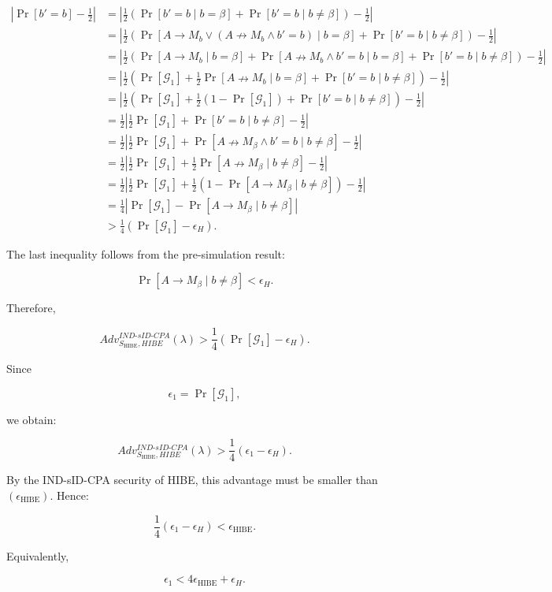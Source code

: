 \documentclass[
]{article}
\begin{document}
\[
\begin{aligned}
\left|\Pr[b'=b]-\frac{1}{2}\right|
&=
\left|
\frac{1}{2}
\left(
\Pr[b'=b\mid b=\beta]
+
\Pr[b'=b\mid b\neq\beta]
\right)
-
\frac{1}{2}
\right| \\[2mm]
&=
\left|
\frac{1}{2}
\left(
\Pr[A\to M_b \vee (A\nrightarrow M_b \wedge b'=b)\mid b=\beta]
+
\Pr[b'=b\mid b\neq\beta]
\right)
-
\frac{1}{2}
\right| \\[2mm]
&=
\left|
\frac{1}{2}
\left(
\Pr[A\to M_b\mid b=\beta]
+
\Pr[A\nrightarrow M_b \wedge b'=b\mid b=\beta]
+
\Pr[b'=b\mid b\neq\beta]
\right)
-
\frac{1}{2}
\right| \\[2mm]
&=
\left|
\frac{1}{2}
\left(
\Pr[\mathcal{G}_1]
+
\frac{1}{2}\Pr[A\nrightarrow M_b\mid b=\beta]
+
\Pr[b'=b\mid b\neq\beta]
\right)
-
\frac{1}{2}
\right| \\[2mm]
&=
\left|
\frac{1}{2}
\left(
\Pr[\mathcal{G}_1]
+
\frac{1}{2}(1-\Pr[\mathcal{G}_1])
+
\Pr[b'=b\mid b\neq\beta]
\right)
-
\frac{1}{2}
\right| \\[2mm]
&=
\frac{1}{2}
\left|
\frac{1}{2}\Pr[\mathcal{G}_1]
+
\Pr[b'=b\mid b\neq\beta]
-
\frac{1}{2}
\right| \\[2mm]
&=
\frac{1}{2}
\left|
\frac{1}{2}\Pr[\mathcal{G}_1]
+
\Pr[A\nrightarrow M_\beta \wedge b'=b\mid b\neq\beta]
-
\frac{1}{2}
\right| \\[2mm]
&=
\frac{1}{2}
\left|
\frac{1}{2}\Pr[\mathcal{G}_1]
+
\frac{1}{2}\Pr[A\nrightarrow M_\beta\mid b\neq\beta]
-
\frac{1}{2}
\right| \\[2mm]
&=
\frac{1}{2}
\left|
\frac{1}{2}\Pr[\mathcal{G}_1]
+
\frac{1}{2}
\left(
1-\Pr[A\to M_\beta\mid b\neq\beta]
\right)
-
\frac{1}{2}
\right| \\[2mm]
&=
\frac{1}{4}
\left|
\Pr[\mathcal{G}_1]
-
\Pr[A\to M_\beta\mid b\neq\beta]
\right| \\[2mm]
&>
\frac{1}{4}
\left(
\Pr[\mathcal{G}_1]
-
\epsilon_H
\right).
\end{aligned}
\]

The last inequality follows from the pre-simulation result:

\[
\Pr[A\to M_\beta\mid b\neq\beta] < \epsilon_H.
\]

Therefore,

\[
Adv_{S_{\mathrm{HIBE}},HIBE}^{IND\text{-}sID\text{-}CPA}(\lambda)
>
\frac{1}{4}
\left(
\Pr[\mathcal{G}_1]
-
\epsilon_H
\right).
\]

Since

\[
\epsilon_1=\Pr[\mathcal{G}_1],
\]

we obtain:

\[
Adv_{S_{\mathrm{HIBE}},HIBE}^{IND\text{-}sID\text{-}CPA}(\lambda)
>
\frac{1}{4}
(\epsilon_1-\epsilon_H).
\]

By the IND-sID-CPA security of HIBE, this advantage must be smaller than
\((\epsilon_{\mathrm{HIBE}})\). Hence:

\[
\frac{1}{4}
(\epsilon_1-\epsilon_H)
<
\epsilon_{\mathrm{HIBE}}.
\]

Equivalently,

\[
\epsilon_1
<
4\epsilon_{\mathrm{HIBE}}
+
\epsilon_H.
\]
\end{document}
